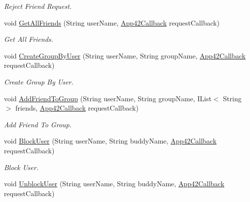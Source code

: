 \begin{DoxyCompactItemize}
\begin{DoxyCompactList}\small\item\em Reject Friend Request. \end{DoxyCompactList}\item 
void \hyperlink{classcom_1_1shephertz_1_1app42_1_1paas_1_1sdk_1_1windows_1_1buddy_1_1_buddy_service_a3f0d574910058919e2bf942aa71a6a3e}{Get\+All\+Friends} (String user\+Name, \hyperlink{interfacecom_1_1shephertz_1_1app42_1_1paas_1_1sdk_1_1windows_1_1_app42_callback}{App42\+Callback} request\+Callback)
\begin{DoxyCompactList}\small\item\em Get All Friends. \end{DoxyCompactList}\item 
void \hyperlink{classcom_1_1shephertz_1_1app42_1_1paas_1_1sdk_1_1windows_1_1buddy_1_1_buddy_service_a5b96378c9e2c24204651ea735820e89f}{Create\+Group\+By\+User} (String user\+Name, String group\+Name, \hyperlink{interfacecom_1_1shephertz_1_1app42_1_1paas_1_1sdk_1_1windows_1_1_app42_callback}{App42\+Callback} request\+Callback)
\begin{DoxyCompactList}\small\item\em Create Group By User. \end{DoxyCompactList}\item 
void \hyperlink{classcom_1_1shephertz_1_1app42_1_1paas_1_1sdk_1_1windows_1_1buddy_1_1_buddy_service_a6ba487eb34bab195a8ee4ac31661472c}{Add\+Friend\+To\+Group} (String user\+Name, String group\+Name, I\+List$<$ String $>$ friends, \hyperlink{interfacecom_1_1shephertz_1_1app42_1_1paas_1_1sdk_1_1windows_1_1_app42_callback}{App42\+Callback} request\+Callback)
\begin{DoxyCompactList}\small\item\em Add Friend To Group. \end{DoxyCompactList}\item 
void \hyperlink{classcom_1_1shephertz_1_1app42_1_1paas_1_1sdk_1_1windows_1_1buddy_1_1_buddy_service_a5a0bc69f393551c390ae911c4b047abe}{Block\+User} (String user\+Name, String buddy\+Name, \hyperlink{interfacecom_1_1shephertz_1_1app42_1_1paas_1_1sdk_1_1windows_1_1_app42_callback}{App42\+Callback} request\+Callback)
\begin{DoxyCompactList}\small\item\em Block User. \end{DoxyCompactList}\item 
void \hyperlink{classcom_1_1shephertz_1_1app42_1_1paas_1_1sdk_1_1windows_1_1buddy_1_1_buddy_service_a4b033961f927e93629f6c0d0ada184fb}{Unblock\+User} (String user\+Name, String buddy\+Name, \hyperlink{interfacecom_1_1shephertz_1_1app42_1_1paas_1_1sdk_1_1windows_1_1_app42_callback}{App42\+Callback} request\+Callback)

\end{DoxyCompactItemize}
